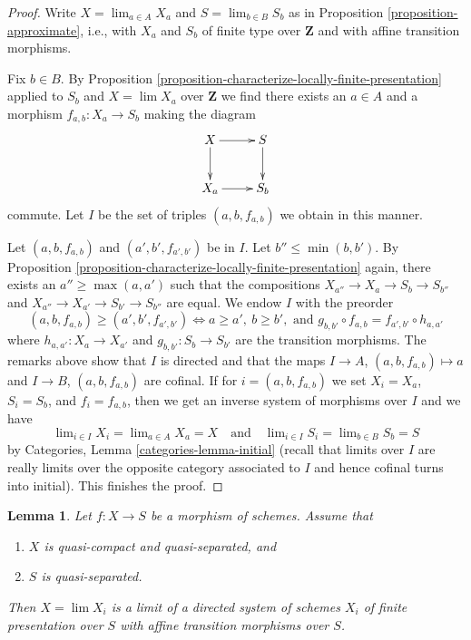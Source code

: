 \documentclass{stacks-project}
\theoremstyle{plain}
\newtheorem{lemma}[subsection]{Lemma}
\theoremstyle{definition}
\theoremstyle{remark}
\numberwithin{equation}{subsection}
\def\lim{\mathop{\mathrm{lim}}\nolimits}
\begin{document}
\begin{proof}
Write $X = \lim_{a \in A} X_a$ and $S = \lim_{b \in B} S_b$ as in
Proposition \ref{proposition-approximate}, i.e., with $X_a$ and $S_b$
of finite type over $\mathbf{Z}$ and with affine transition morphisms.

\medskip\noindent
Fix $b \in B$.
By Proposition \ref{proposition-characterize-locally-finite-presentation}
applied to $S_b$ and $X = \lim X_a$ over $\mathbf{Z}$
we find there exists an $a \in A$ and a morphism
$f_{a, b} : X_a \to S_b$ making the diagram
$$
\xymatrix{
X \ar[d] \ar[r] & S \ar[d] \\
X_a \ar[r] & S_b
}
$$
commute. Let $I$ be the set of triples $(a, b, f_{a, b})$ we
obtain in this manner.

\medskip\noindent
Let $(a, b, f_{a, b})$ and $(a', b', f_{a', b'})$ be in $I$.
Let $b'' \leq \min(b, b')$. By
Proposition \ref{proposition-characterize-locally-finite-presentation}
again, there exists an $a'' \geq \max(a, a')$ such that
the compositions $X_{a''} \to X_a \to S_b \to S_{b''}$ and
$X_{a''} \to X_{a'} \to S_{b'} \to S_{b''}$ are equal.
We endow $I$ with the preorder
$$
(a, b, f_{a, b}) \geq (a', b', f_{a', b'})
\Leftrightarrow
a \geq a',\ b \geq b',\text{ and }
g_{b, b'} \circ f_{a, b} = f_{a', b'} \circ h_{a, a'}
$$
where $h_{a, a'} : X_a \to X_{a'}$ and $g_{b, b'} : S_b \to S_{b'}$
are the transition morphisms. The remarks above show that $I$
is directed and that the maps $I \to A$, $(a, b, f_{a, b}) \mapsto a$
and $I \to B$, $(a, b, f_{a, b})$ are cofinal. If for $i = (a, b, f_{a, b})$
we set $X_i = X_a$, $S_i = S_b$, and $f_i = f_{a, b}$, then we get
an inverse system of morphisms over $I$ and we have
$$
\lim_{i \in I} X_i = \lim_{a \in A} X_a = X
\quad\text{and}\quad
\lim_{i \in I} S_i = \lim_{b \in B} S_b = S
$$
by Categories, Lemma \ref{categories-lemma-initial} (recall that
limits over $I$ are really limits over the opposite category
associated to $I$ and hence cofinal turns into initial).
This finishes the proof.
\end{proof}

\begin{lemma}
\label{lemma-relative-approximation}
Let $f : X \to S$ be a morphism of schemes. Assume that
\begin{enumerate}
\item $X$ is quasi-compact and quasi-separated, and
\item $S$ is quasi-separated.
\end{enumerate}
Then $X = \lim X_i$ is a limit of a directed system of schemes
$X_i$ of finite presentation over $S$ with affine transition morphisms
over $S$.
\end{lemma}
\end{document}
